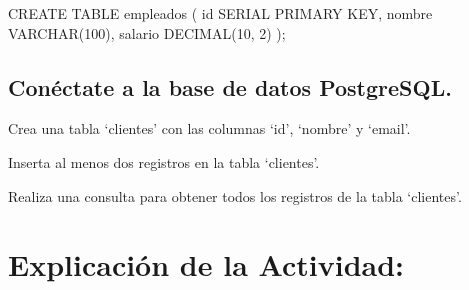 \documentclass[
  a4paper,
  DIV=11,
  numbers=noendperiod,
  onepage,
  openany]{scrreprt}
\newenvironment{Shaded}{\begin{snugshade}}{\end{snugshade}}
\newcommand{\DataTypeTok}[1]{\textcolor[rgb]{0.68,0.00,0.00}{#1}}
\newcommand{\DecValTok}[1]{\textcolor[rgb]{0.68,0.00,0.00}{#1}}
\newcommand{\KeywordTok}[1]{\textcolor[rgb]{0.00,0.23,0.31}{#1}}
\newcommand{\NormalTok}[1]{\textcolor[rgb]{0.00,0.23,0.31}{#1}}
\begin{document}
\begin{Shaded}
\begin{Highlighting}[]
\KeywordTok{CREATE} \KeywordTok{TABLE}\NormalTok{ empleados (}
    \KeywordTok{id}\NormalTok{ SERIAL }\KeywordTok{PRIMARY} \KeywordTok{KEY}\NormalTok{,}
\NormalTok{    nombre }\DataTypeTok{VARCHAR}\NormalTok{(}\DecValTok{100}\NormalTok{),}
\NormalTok{    salario }\DataTypeTok{DECIMAL}\NormalTok{(}\DecValTok{10}\NormalTok{, }\DecValTok{2}\NormalTok{)}
\NormalTok{);}
\end{Highlighting}
\end{Shaded}

\begin{tcolorbox}[enhanced jigsaw, colbacktitle=quarto-callout-important-color!10!white, toprule=.15mm, leftrule=.75mm, titlerule=0mm, opacityback=0, rightrule=.15mm, opacitybacktitle=0.6, breakable, left=2mm, coltitle=black, title=\textcolor{quarto-callout-important-color}{\faExclamation}\hspace{0.5em}{Actividad Práctica}, toptitle=1mm, bottomtitle=1mm, arc=.35mm, bottomrule=.15mm, colback=white, colframe=quarto-callout-important-color-frame]

\hypertarget{conuxe9ctate-a-la-base-de-datos-postgresql.-1}{%
\section{Conéctate a la base de datos
PostgreSQL.}\label{conuxe9ctate-a-la-base-de-datos-postgresql.-1}}

Crea una tabla `clientes' con las columnas `id', `nombre' y `email'.

Inserta al menos dos registros en la tabla `clientes'.

Realiza una consulta para obtener todos los registros de la tabla
`clientes'.

\end{tcolorbox}

\hypertarget{explicaciuxf3n-de-la-actividad-75}{%
\section{Explicación de la
Actividad:}\label{explicaciuxf3n-de-la-actividad-75}}
\end{document}
